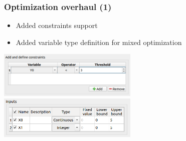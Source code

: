 \documentclass[aspectratio=169]{beamer}
\begin{document}

\begin{frame}
  \frametitle{Optimization overhaul (1)}
   \begin{itemize}
   \item Added constraints support
   \item Added variable type definition for mixed optimization
   \end{itemize}
   \begin{center}
     \includegraphics[width=0.5\textwidth]{figures/optimCstr.png} \includegraphics[width=0.5\textwidth]{figures/optimVarTypes.png}
  \end{center}
\end{frame}

\end{document}
